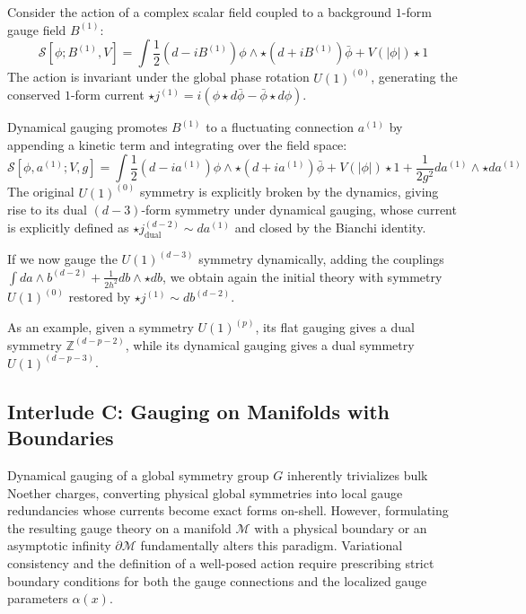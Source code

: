 \documentclass[aps,preprint,nofootinbib,preprintnumbers,eqsecnum,superscriptaddress]{revtex4}
\numberwithin{equation}{section}
\begin{document}
\begin{tcolorbox}[colback=green!5!white, colframe=green!75!black, title={Example: Complex Scalar Boson $\xrightarrow{\text{\quad dynamical gauging \quad}}$ Scalar QED}]
        Consider the action of a complex scalar field coupled to a background $1$-form gauge field $B^{(1)}$:
    \begin{equation}
        \mathcal{S}[\phi; B^{(1)}, V] = \int \frac{1}{2}(d - iB^{(1)})\phi \wedge \star (d + iB^{(1)}) \bar \phi + V(|\phi|) \star 1
    \end{equation}
    The action is invariant under the global phase rotation $U(1)^{(0)}$, generating the conserved $1$-form current $\star j^{(1)} = i(\phi \star d \bar \phi - \bar \phi \star d \phi)$.

    Dynamical gauging promotes $B^{(1)}$ to a fluctuating connection $a^{(1)}$ by appending a kinetic term and integrating over the field space:
    \begin{equation}
        \mathcal{S}[\phi, a^{(1)};V, g] = \int \frac{1}{2}(d - ia^{(1)})\phi \wedge \star (d + ia^{(1)}) \bar \phi + V(|\phi|) \star 1 + \frac{1}{2 g^2} da^{(1)} \wedge \star da^{(1)}
    \end{equation}
    The original $U(1)^{(0)}$ symmetry is explicitly broken by the dynamics, giving rise to its dual $(d-3)$-form symmetry under dynamical gauging, whose current is explicitly defined as $\star j^{(d-2)}_{\text{dual}} \sim da^{(1)}$ and closed by the Bianchi identity.

    If we now gauge the $U(1)^{(d-3)}$ symmetry dynamically, adding the couplings $\int da \wedge b^{(d-2)} + \frac{1}{2 h^2}db\wedge \star db$, we obtain again the initial theory with symmetry $U(1)^{(0)}$ restored by $\star j^{(1)} \sim db^{(d-2)}$.
\end{tcolorbox}

As an example, given a symmetry $U(1)^{(p)}$, its flat gauging gives a dual symmetry $\mathbb{Z}^{(d-p-2)}$, while its dynamical gauging gives a dual symmetry $U(1)^{(d-p-3)}$.

\subsection{Interlude C: Gauging on Manifolds with Boundaries}\label{section:gauging_boundaries}

Dynamical gauging of a global symmetry group $G$ inherently trivializes bulk Noether charges, converting physical global symmetries into local gauge redundancies whose currents become exact forms on-shell. However, formulating the resulting gauge theory on a manifold $\mathcal{M}$ with a physical boundary or an asymptotic infinity $\partial \mathcal{M}$ fundamentally alters this paradigm. Variational consistency and the definition of a well-posed action require prescribing strict boundary conditions for both the gauge connections and the localized gauge parameters $\alpha(x)$. 
\end{document}
